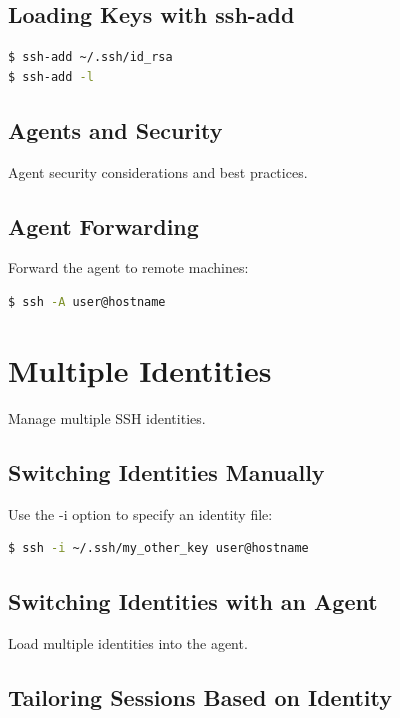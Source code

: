\documentclass[12pt]{book}
\begin{document}
\subsection{Loading Keys with ssh-add}

\begin{lstlisting}[language=bash]
$ ssh-add ~/.ssh/id_rsa
$ ssh-add -l
\end{lstlisting}

\subsection{Agents and Security}

Agent security considerations and best practices.

\subsection{Agent Forwarding}

Forward the agent to remote machines:

\begin{lstlisting}[language=bash]
$ ssh -A user@hostname
\end{lstlisting}

\section{Multiple Identities}

Manage multiple SSH identities.

\subsection{Switching Identities Manually}

Use the -i option to specify an identity file:

\begin{lstlisting}[language=bash]
$ ssh -i ~/.ssh/my_other_key user@hostname
\end{lstlisting}

\subsection{Switching Identities with an Agent}

Load multiple identities into the agent.

\subsection{Tailoring Sessions Based on Identity}
\end{document}
